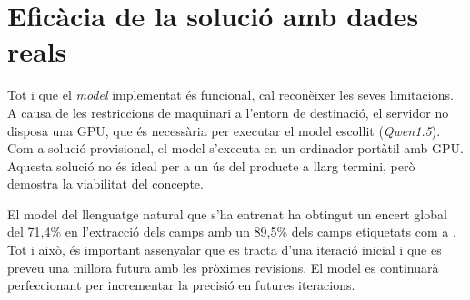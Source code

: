\section{Eficàcia de la solució amb dades reals}

Tot i que el \textit{model} implementat és funcional, cal reconèixer les seves limitacions. A causa de les restriccions de maquinari a l'entorn de destinació, el servidor no disposa una GPU, que és necessària per executar el model escollit (\textit{Qwen1.5}). Com a solució provisional, el model s'executa en un ordinador portàtil amb GPU. Aquesta solució no és ideal per a un ús del producte a llarg termini, però demostra la viabilitat del concepte.

El model del llenguatge natural que s'ha entrenat ha obtingut un encert global del 71,4\% en l'extracció dels camps amb un 89,5\% dels camps etiquetats com a . Tot i això, és important assenyalar que es tracta d'una iteració inicial i que es preveu una millora futura amb les pròximes revisions. El model es continuarà perfeccionant per incrementar la precisió en futures iteracions.
